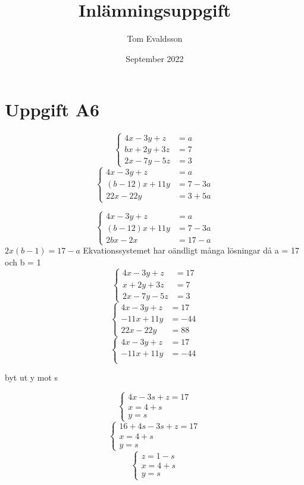 \documentclass{article}
\title{Inlämningsuppgift}
\author{Tom Evaldsson}
\date{September 2022}
\begin{document}
\maketitle

\section{Uppgift A6}
$$ \left\{
\begin{array}{lr}
4x - 3y + z &= a\\
bx + 2y + 3z &= 7\\
2x - 7y - 5z &= 3
\end{array}
\right.
$$
$$
\left\{
\begin{array}{lr}
4x - 3y + z &= a\\
(b-12)x+11y &= 7-3a\\
22x - 22y &= 3+5a
\end{array}
\right.
$$

$$
\left\{
\begin{array}{lr}
4x - 3y + z &= a\\
(b-12)x+11y &= 7-3a\\
2bx - 2x&= 17-a
\end{array}
\right.
$$
$2x(b - 1) = 17-a$ \newline
Ekvationssystemet har oändligt många lösningar då a = 17 och b = 1
$$ \left\{
\begin{array}{lr}
4x - 3y + z &= 17\\
x + 2y + 3z &= 7\\
2x - 7y - 5z &= 3
\end{array}
\right.
$$
$$ \left\{
\begin{array}{lr}
4x - 3y + z &= 17\\
-11x+11y &= -44\\
22x-22y &= 88
\end{array}
\right.
$$
$$ \left\{
\begin{array}{lr}
4x - 3y + z &= 17\\
-11x+11y &= -44\\
\end{array}
\right.
$$

byt ut y mot s

$$ \left\{
\begin{array}{lr}
4x - 3s + z = 17\\
x = 4 + s\\
y = s
\end{array}
\right.
$$
$$ \left\{
\begin{array}{lr}
16+4s - 3s + z = 17\\
x = 4 + s\\
y = s
\end{array}
\right.
$$
$$ \left\{
\begin{array}{lr}
z = 1-s\\
x = 4 + s\\
y = s
\end{array}
\right.
$$
\end{document}
